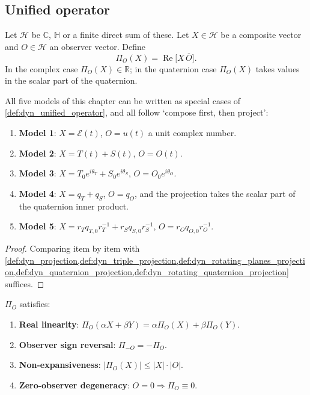 \subsection{Unified operator}

\begin{definition}\label{def:dyn_unified_operator}
Let $\mathcal H$ be $\mathbb C$, $\mathbb H$ or a finite direct sum of these. Let $X\in\mathcal H$ be a composite vector and $O\in\mathcal H$ an observer vector. Define
\[
\Pi_O(X)=\operatorname{Re}\!\big[X\,\overline O\big].
\]
In the complex case $\Pi_O(X)\in\mathbb R$; in the quaternion case $\Pi_O(X)$ takes values in the scalar part of the quaternion.
\end{definition}

\begin{theorem}\label{thm:dyn_unified_representation}
All five models of this chapter can be written as special cases of \cref{def:dyn_unified_operator}, and all follow `compose first, then project':
\begin{enumerate}[label=(\roman*)]
    \item \textbf{Model 1}: $X=\mathcal E(t)$, $O=u(t)$ a unit complex number.
    \item \textbf{Model 2}: $X=T(t)+S(t)$, $O=O(t)$.
    \item \textbf{Model 3}: $X=T_0e^{i\theta_T}+S_0e^{i\theta_S}$, $O=O_0e^{i\theta_O}$.
    \item \textbf{Model 4}: $X=q_T+q_S$, $O=q_O$, and the projection takes the scalar part of the quaternion inner product.
    \item \textbf{Model 5}: $X=r_Tq_{T,0}r_T^{-1}+r_Sq_{S,0}r_S^{-1}$, $O=r_Oq_{O,0}r_O^{-1}$.
\end{enumerate}
\end{theorem}

\begin{proof}
Comparing item by item with \cref{def:dyn_projection,def:dyn_triple_projection,def:dyn_rotating_planes_projection,def:dyn_quaternion_projection,def:dyn_rotating_quaternion_projection} suffices.
\end{proof}

\begin{corollary}\label{cor:dyn_projection_axioms}
$\Pi_O$ satisfies:
\begin{enumerate}[label=(\roman*)]
    \item \textbf{Real linearity}: $\Pi_O(\alpha X+\beta Y)=\alpha\Pi_O(X)+\beta\Pi_O(Y)$.
    \item \textbf{Observer sign reversal}: $\Pi_{-O}=-\Pi_O$.
    \item \textbf{Non-expansiveness}: $|\Pi_O(X)|\le|X|\cdot|O|$.
    \item \textbf{Zero-observer degeneracy}: $O=0\Rightarrow\Pi_O\equiv 0$.
\end{enumerate}
\end{corollary}


